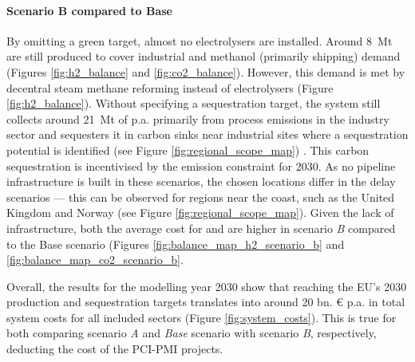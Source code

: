 \documentclass[preprint,12pt]{elsarticle}
\begin{document}
\paragraph{Scenario B compared to Base}
By omitting a green  target, almost no electrolysers are installed. Around \SI{8}{Mt} are still produced to cover industrial  and methanol (primarily shipping) demand (Figures \ref{fig:h2_balance} and \ref{fig:co2_balance}). However, this demand is met by decentral steam methane reforming instead of electrolysers (Figure \ref{fig:h2_balance}). 
Without specifying a  sequestration target, the system still collects around \SI{21}{Mt} of  p.a. primarily from process emissions in the industry sector and sequesters it in carbon sinks near industrial sites where a sequestration potential is identified (see Figure \ref{fig:regional_scope_map}) \cite{hofmannH2CO2Network2024}. This carbon sequestration is incentivised by the emission constraint for 2030. As no pipeline infrastructure is built in these scenarios, the chosen locations differ in the delay scenarios --- this can be observed for regions near the coast, such as the United Kingdom and Norway (see Figure \ref{fig:regional_scope_map}). Given the lack of infrastructure, both the average cost for  and  are higher in scenario \textit{B} compared to the Base scenario (Figures \ref{fig:balance_map_h2_scenario_b} and \ref{fig:balance_map_co2_scenario_b}.

Overall, the results for the modelling year 2030 show that reaching the EU's 2030  production and  sequestration targets translates into around 20 bn. \euro{} p.a. in total system costs for all included sectors (Figure \ref{fig:system_costs}). This is true for both comparing scenario \textit{A} and \textit{Base} scenario with scenario \textit{B}, respectively, deducting the cost of the PCI-PMI projects.
\end{document}
